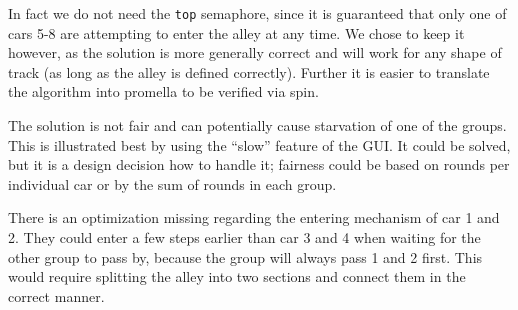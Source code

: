 In fact we do not need the \texttt{top} semaphore, since it is guaranteed that only one of cars 5-8 are attempting to enter the alley at any time. We chose to keep it however, as the solution is more generally correct and will work for any shape of track (as long as the alley is defined correctly). Further it is easier to translate the algorithm into promella to be verified via spin.

The solution is not fair and can potentially cause starvation of one of the groups. This is illustrated best by using the ``slow'' feature of the GUI. It could be solved, but it is a design decision how to handle it; fairness could be based on rounds per individual car or by the sum of rounds in each group.

There is an optimization missing regarding the entering mechanism of car 1 and 2. They could enter a few steps earlier than car 3 and 4 when waiting for the other group to pass by, because the group will always pass 1 and 2 first. This would require splitting the alley into two sections and connect them in the correct manner.

